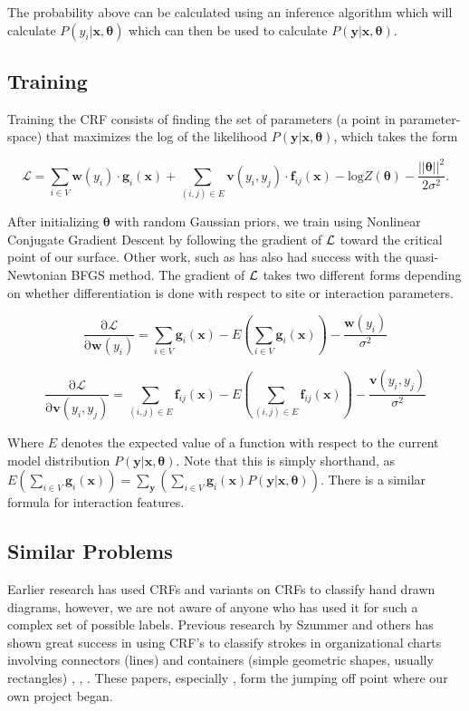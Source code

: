 \documentclass[10pt]{acmsiggraph}               %
\newcommand{\bm}[1]{\boldsymbol{#1}}
\begin{document}
The probability above can be calculated using an inference algorithm which will calculate $P(y_{i}|\bm{x},\bm{\theta})$ which can then be used to calculate $P(\bm{y}|\bm{x},\bm{\theta})$.

\subsection{Training}

Training the CRF consists of finding the set of parameters (a point in parameter-space) that maximizes the log of the likelihood $P(\bm{y}|\bm{x},\bm{\theta})$, which takes the form

\[
	\mbox{$\mathcal L$} = \sum_{i \in V} \bm{w}(y_i) \cdot \bm{g}_i (\bm{x}) + 
	\sum_{(i, j) \in E}	\bm{v}(y_i, y_j) \cdot \bm{f}_{i j} (\bm{x}) - 
	\mathrm{log}Z(\bm{\theta}) -
	\frac{||\bm{\theta}||^2}{2\sigma^2}.
\]

After initializing $\bm{\theta}$ with random Gaussian priors, we train using Nonlinear Conjugate Gradient Descent by following the gradient of $\cal L$ toward the critical
point of our surface.  Other work, such as \cite{szummer:CRFrecog} has also had success with the quasi-Newtonian BFGS method.  The gradient of $\cal L$ takes two different
forms depending on whether differentiation is done with respect to site or interaction parameters. 

\[
	\frac{\mathrm{\partial}\mbox{$\mathcal L$}}{\mathrm{\partial}\bm{w}(y_i)} = 
	\sum_{i \in V} \bm{g}_i (\bm{x}) - 
	E \left(\sum_{i \in V} \bm{g}_i (\bm{x})\right)
	 - \frac{\bm{w}(y_i)}{\sigma^2}
\]

\[
	\frac{\mathrm{\partial}\mbox{$\mathcal L$}}{\mathrm{\partial}\bm{v}(y_i,y_j)} = 
		\sum_{(i, j) \in E} \bm{f}_{i j} (\bm{x}) - 
		E\left(\sum_{(i, j) \in E} \bm{f}_{i j} (\bm{x})\right)
		 - \frac{\bm{v}(y_i,y_j)}{\sigma^2}
\]

Where $E$ denotes the expected value of a function with respect to the current model distribution $P(\bm{y}|\bm{x},\bm{\theta})$.  Note that this is simply shorthand, as $E \left(\sum_{i \in V} \bm{g}_i (\bm{x})\right) = \sum_{\bm{y}} \left(\sum_{i \in V} \bm{g}_i (\bm{x}) P(\bm{y}|\bm{x},\bm{\theta})\right)$.  There is a similar formula for interaction features.

\subsection{Similar Problems}

Earlier research has used CRFs and variants on CRFs to classify hand drawn diagrams, however, we are not aware of anyone who has used it for such a complex set of possible labels.  Previous research by Szummer and others has shown great success in using CRF's to classify strokes in organizational charts involving connectors (lines) and containers (simple geometric shapes, usually rectangles) \cite{szummer:CRFrecog}, \cite{szummer:HRF}, \cite{cowansSzummer}. These papers, especially \cite{szummer:CRFrecog}, form the jumping off point where our own project began.  
\end{document}
